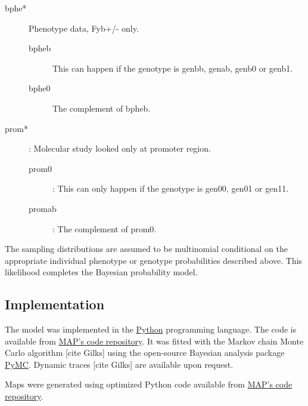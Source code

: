 \documentclass[a4paper]{article}
\begin{document}
\begin{description}
\begin{description}
    \end{description}
    \item[bphe*] Phenotype data, Fyb+/- only.
    \begin{description}
        \item[bpheb] This can happen if the genotype is genbb, genab, genb0 or genb1.
        \item[bphe0] The complement of bpheb. 
    \end{description}
    \item[prom*]: Molecular study looked only at promoter region.
    \begin{description}
        \item[prom0]: This can only happen if the genotype is gen00, gen01 or gen11.
        \item[promab]: The complement of prom0.
    \end{description}
\end{description}

The sampling distributions are assumed to be multinomial conditional on the appropriate individual phenotype or genotype probabilities described above. This likelihood completes the Bayesian probability model.

\subsection{Implementation} 
The model was implemented in the \href{www.python.org}{Python} programming language. The code is available from \href{github.com/malaria-atlas-project/ibd-world}{MAP's code repository}. It was fitted with the Markov chain Monte Carlo algorithm [cite Gilks] using the open-source Bayesian analysis package \href{code.google.com/p/pymc}{PyMC}. Dynamic traces [cite Gilks] are available upon request.

Maps were generated using optimized Python code available from \href{github.com/malaria-atlas-project/generic-mbg}{MAP's code repository}.
\end{document}
